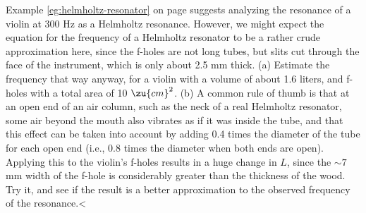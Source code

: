 Example \ref{eg:helmholtz-resonator} on page \pageref{eg:helmholtz-resonator} suggests
analyzing the resonance of a violin at 300 Hz as a Helmholtz resonance. However,
we might expect the equation for the frequency of a Helmholtz resonator to
be a rather crude approximation here, since the f-holes are not long tubes, but
slits cut through the face of the instrument, which is only about 2.5 mm thick. (a) Estimate the frequency
that way anyway, for a violin with a volume of about 1.6 liters, and f-holes with
a total area of 10 $\zu{cm}^2$. (b) A common rule of thumb is that at an open end of
an air column, such as the neck of a real Helmholtz resonator, some air beyond the
mouth also vibrates as if it was inside the tube, and that this effect can be taken
into account by adding 0.4 times the diameter of the tube for each open end (i.e.,
0.8 times the diameter when both ends are open). Applying
this to the violin's f-holes results in a huge change in $L$, since the $\sim 7$ mm width
of the f-hole is considerably greater than the thickness of the wood. Try it, and
see if the result is a better approximation to the observed frequency of the
resonance.<%
